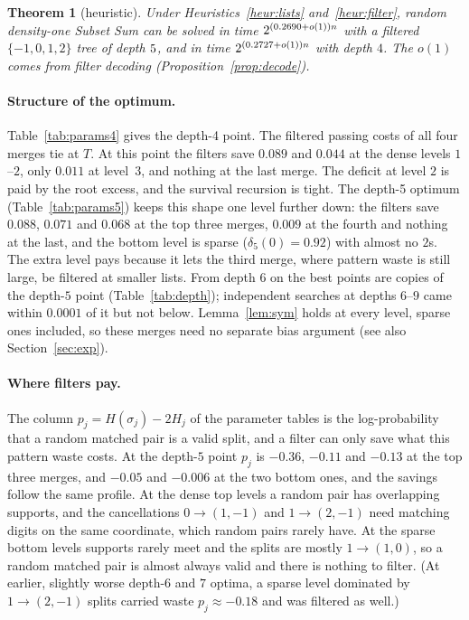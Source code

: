 \documentclass[11pt]{article}
\newtheorem{theorem}{Theorem}
\theoremstyle{definition}
\theoremstyle{remark}
\begin{document}
\begin{theorem}[heuristic]\label{thm:main}
Under Heuristics~\ref{heur:lists} and~\ref{heur:filter}, random density-one Subset Sum can be solved in time
$2^{(0.2690+o(1))n}$ with a filtered $\{-1,0,1,2\}$ tree of depth $5$, and in time
$2^{(0.2727+o(1))n}$ with depth $4$. The $o(1)$ comes from filter decoding (Proposition~\ref{prop:decode}).
\end{theorem}

\paragraph{Structure of the optimum.} Table~\ref{tab:params4} gives the depth-4 point. The filtered passing costs of
all four merges tie at $T$. At this point the filters save $0.089$ and $0.044$ at the dense levels $1$--$2$, only $0.011$ at
level~$3$, and nothing at the last merge. The deficit at level $2$ is paid by the root excess, and the survival
recursion is tight. The depth-5 optimum (Table~\ref{tab:params5}) keeps this shape one level further down: the
filters save $0.088$, $0.071$ and $0.068$ at the top three merges, $0.009$ at the fourth and nothing at the last, and
the bottom level is sparse ($\delta_5(0)=0.92$) with almost no $2$s. The extra level pays because it lets the third
merge, where pattern waste is still large, be filtered at smaller lists. From depth $6$ on the best points are copies
of the depth-$5$ point (Table~\ref{tab:depth}); independent searches at depths $6$--$9$ came within $0.0001$ of it but
not below. Lemma~\ref{lem:sym} holds at every level, sparse ones included, so these merges need no separate bias
argument (see also Section~\ref{sec:exp}).

\paragraph{Where filters pay.} The column $p_j=H(\sigma_j)-2H_j$ of the parameter tables is the log-probability that a
random matched pair is a valid split, and a filter can only save what this pattern waste costs. At the depth-$5$
point $p_j$ is $-0.36$, $-0.11$ and $-0.13$ at the top three merges, and $-0.05$ and $-0.006$ at the two bottom ones,
and the savings follow the same profile. At the dense top levels a random pair has overlapping supports, and the
cancellations $0\to(1,-1)$ and $1\to(2,-1)$ need matching digits on the same coordinate, which random pairs rarely
have. At the sparse bottom levels supports rarely meet and the splits are mostly $1\to(1,0)$, so a random matched
pair is almost always valid and there is nothing to filter. (At earlier, slightly worse depth-$6$ and $7$ optima, a
sparse level dominated by $1\to(2,-1)$ splits carried waste $p_j\approx-0.18$ and was filtered as well.)
\end{document}
